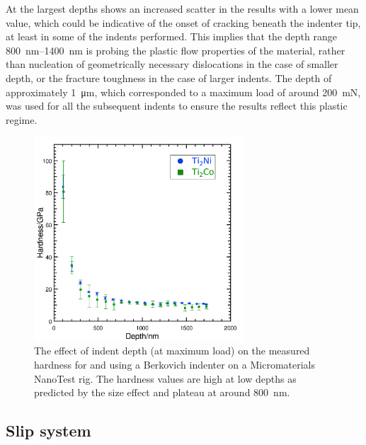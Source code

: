 At the largest depths  shows an increased scatter in the results with a lower mean value, which could be indicative of the onset of cracking beneath the indenter tip, at least in some of the indents performed. This implies that the depth range \SIrange{800}{1400}{\nano\meter} is probing the plastic flow properties of the material, rather than nucleation of geometrically necessary dislocations in the case of smaller depth, or the fracture toughness in the case of larger indents. The depth of approximately \SI{1}{\micro\meter}, which corresponded to a maximum load of around \SI{200}{\milli\newton}, was used for all the subsequent indents to ensure the results reflect this plastic regime.


\begin{figure}
\centering
\includegraphics[width=0.7\textwidth]{Depth_vs_Hardness_Ti2Ni}
\caption[The size effect on indentation in ]{The effect of indent depth (at maximum load) on the measured hardness for  and  using a Berkovich indenter on a Micromaterials NanoTest rig. The hardness values are high at low depths as predicted by the size effect \cite{Cripps2011} and plateau at around \SI{800}{\nano\meter}.\label{fig:Depth_vs_hardness_Ti2Ni}}
\end{figure}














\FloatBarrier
\subsection{Slip system}
\FloatBarrier




